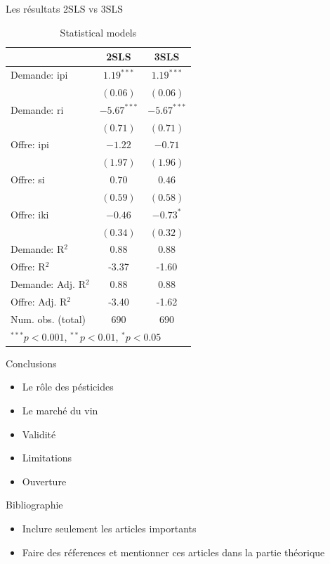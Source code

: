 \documentclass[11pt,ignorenonframetext,]{beamer}
\providecommand{\tightlist}{%
  \setlength{\itemsep}{0pt}\setlength{\parskip}{0pt}}
\begin{document}
\begin{frame}{Les résultats 2SLS vs 3SLS}
\protect\hypertarget{les-resultats-2sls-vs-3sls}{}

\tiny

\begin{table}
\begin{center}
\begin{tabular}{l c c }
\hline
 & 2SLS & 3SLS \\
\hline
Demande: ipi        & $1.19^{***}$  & $1.19^{***}$  \\
                    & $(0.06)$      & $(0.06)$      \\
Demande: ri         & $-5.67^{***}$ & $-5.67^{***}$ \\
                    & $(0.71)$      & $(0.71)$      \\
Offre: ipi          & $-1.22$       & $-0.71$       \\
                    & $(1.97)$      & $(1.96)$      \\
Offre: si           & $0.70$        & $0.46$        \\
                    & $(0.59)$      & $(0.58)$      \\
Offre: iki          & $-0.46$       & $-0.73^{*}$   \\
                    & $(0.34)$      & $(0.32)$      \\
\hline
Demande: R$^2$      & 0.88          & 0.88          \\
Offre: R$^2$        & -3.37         & -1.60         \\
Demande: Adj. R$^2$ & 0.88          & 0.88          \\
Offre: Adj. R$^2$   & -3.40         & -1.62         \\
Num. obs. (total)   & 690           & 690           \\
\hline
\multicolumn{3}{l}{\scriptsize{$^{***}p<0.001$, $^{**}p<0.01$, $^*p<0.05$}}
\end{tabular}
\caption{Statistical models}
\label{table:coefficients}
\end{center}
\end{table}
\tiny

\end{frame}

\begin{frame}{Conclusions}
\protect\hypertarget{conclusions}{}

\begin{itemize}
\tightlist
\item
  Le rôle des pésticides
\item
  Le marché du vin
\item
  Validité
\item
  Limitations
\item
  Ouverture
\end{itemize}

\end{frame}

\begin{frame}{Bibliographie}
\protect\hypertarget{bibliographie}{}

\begin{itemize}
\tightlist
\item
  Inclure seulement les articles importants
\item
  Faire des réferences et mentionner ces articles dans la partie
  théorique
\end{itemize}

\end{frame}
\end{document}
